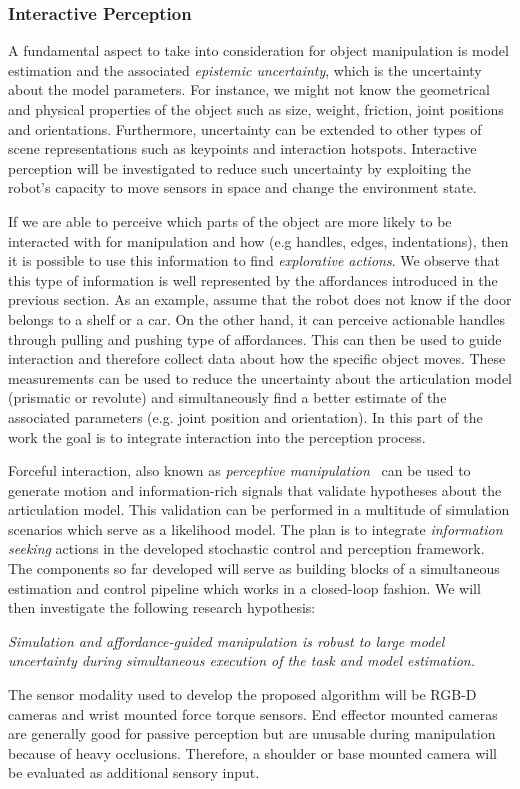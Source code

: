 \subsubsection{Interactive Perception}
A fundamental aspect to take into consideration for object manipulation is model estimation and the associated \emph{epistemic uncertainty}, which is the uncertainty about the model parameters. For instance, we might not know the geometrical and physical properties of the object such as size, weight, friction, joint positions and orientations. Furthermore, uncertainty can be extended to other types of scene representations such as keypoints and interaction hotspots. Interactive perception will be investigated to reduce such uncertainty by exploiting the robot's capacity to move sensors in space and change the environment state.

If we are able to perceive which parts of the object are more likely to be interacted with for manipulation and how (e.g handles, edges, indentations), then it is possible to use this information to find \emph{explorative actions}. We observe that this type of information is well represented by the affordances introduced in the previous section. As an example, assume that the robot does not know if the door belongs to a shelf or a car. On the other hand, it can perceive actionable handles through pulling and pushing type of affordances. This can then be used to guide interaction and therefore collect data about how the specific object moves. These measurements can be used to reduce the uncertainty about the articulation model (prismatic or revolute) and simultaneously find a better estimate of the associated parameters (e.g. joint position and orientation). In this part of the work the goal is to integrate interaction into the perception process.

Forceful interaction, also known as \emph{perceptive manipulation}~\cite{bohg2017interactive} can be used to generate motion and information-rich signals that validate hypotheses about the articulation model. This validation can be performed in a multitude of simulation scenarios which serve as a likelihood model. The plan is to integrate \emph{information seeking} actions in the developed stochastic control and perception framework. The components so far developed will serve as building blocks of a simultaneous estimation and control pipeline which works in a closed-loop fashion. We will then investigate the following research hypothesis:
\begin{displayquote}
\textit{Simulation and affordance-guided manipulation is robust to large model uncertainty during simultaneous execution of the task and model estimation.} 
\end{displayquote}
The sensor modality used to develop the proposed algorithm will be RGB-D cameras and wrist mounted force torque sensors. End effector mounted cameras are generally good for passive perception but are unusable during manipulation because of heavy occlusions. Therefore, a shoulder or base mounted camera will be evaluated as additional sensory input.  
 
